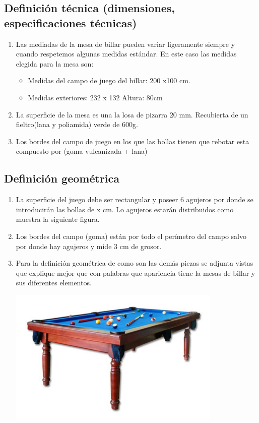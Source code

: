 	\subsection {Definición técnica (dimensiones, especificaciones técnicas)}
			\begin{enumerate}
			\item Las mediadas de la mesa de billar pueden variar ligeramente siempre y cuando respetemos algunas medidas estándar. En este caso las medidas elegida para la mesa son:
				\begin{itemize}      
				\item Medidas del campo de juego del billar: 200 x100 cm.

				\item Medidas exteriores: 232 x 132 Altura: 80cm
				\end{itemize}
				

			\item La superficie de la mesa es una la losa de pizarra 20 mm. Recubierta de un fieltro(lana y poliamida) verde de 600g.

			\item Los bordes del campo de juego en los que las bollas tienen que rebotar esta compuesto por (goma vulcanizada + lana)
			\end{enumerate}


	\subsection {Definición geométrica}
		    \begin{enumerate}
		     \item La superficie del juego debe ser rectangular y poseer 6 agujeros por donde se introducirán las bollas de x cm. Lo  agujeros estarán distribuidos como
			    muestra la siguiente figura.
		     \item Los bordes del campo (goma) están por todo el perímetro del campo salvo por donde hay agujeros y mide  3 cm de grosor.

		     \item Para la definición geométrica de como son las demás piezas  se adjunta vistas que explique mejor que con palabras que apariencia tiene la mesas de billar
			  y sus diferentes elementos.
		\begin{center}
    			\includegraphics[width=0.8\textwidth]{donbillar.png}
		\end{center}	
		    \end{enumerate}



